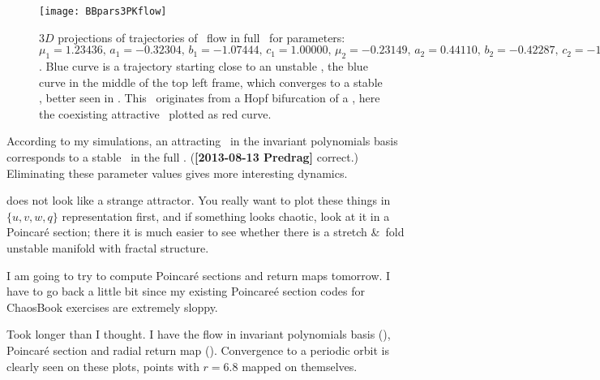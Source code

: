 \begin{description}


\begin{figure}%
  \begin{center}
  \texttt{[image: BBpars3PKflow]}
  \end{center}
  \caption{$3D$ projections of trajectories of \twoMode\ flow in full
  \statesp\ for parameters: $\mu_1 = 1.23436,\, a_1=-0.32304,\,
  b_1=-1.07444,\, c_1=1.00000,\, \mu_2=-0.23149,\, a_2=0.44110,\,
  b_2=-0.42287,\, c_2=-1.00000,\, e_2=0.67556$. Blue curve is a
  trajectory starting close to an unstable \reqv, the blue curve in the
  middle of the top left frame, which converges to a stable \rpo, better
  seen in . This \rpo\ originates from a Hopf
  bifurcation of a \reqv, here the coexisting attractive \reqv\ plotted
  as red curve.
  }
  \label{fig:BBpars3PKflow}
\end{figure}

\item[2013-08-08  Burak]
According to my simulations, an attracting \eqv\ in the invariant
polynomials basis corresponds to a stable \reqv\ in the full \statesp.
({\bf [2013-08-13 Predrag]} correct.)
Eliminating these parameter values
gives more interesting dynamics.

\item[2013-08-13 Predrag]  does not look like a
strange attractor. You really want to plot these things in $\{u,v,w,q\}$
representation first, and if something looks chaotic, look at it in a
Poincar\'e section; there it is much easier to see whether there is a
stretch \&\ fold unstable manifold with fractal structure.

\item[2013-08-14 Burak] I am going to try to compute Poincar\'e
sections and return maps tomorrow. I have to go back a little bit
since my existing Poincare\'e section codes for ChaosBook exercises
are extremely sloppy.


\item[2013-08-19 Burak] Took longer than I thought. I have the
\twoMode flow in invariant polynomials basis
(), Poincar\'e section and radial
return map (). Convergence to a
periodic orbit is clearly seen on these plots, points with $r=6.8$
mapped on themselves.



\end{description}
